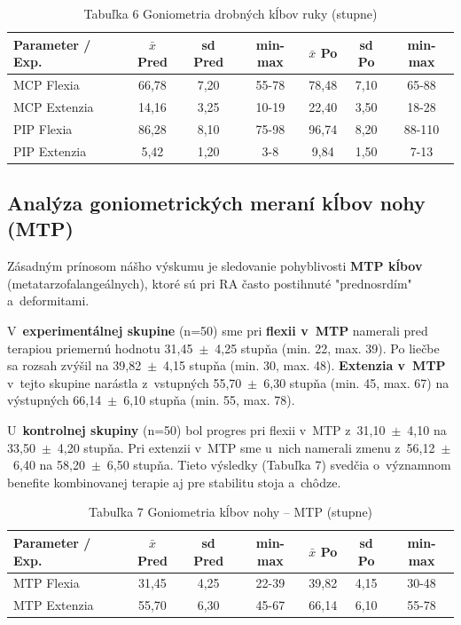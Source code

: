 \begin{table}[H]
\centering
\caption*{Tabuľka 6 Goniometria drobných kĺbov ruky (stupne)}
\begin{tabular}{|l|c|c|c|c|c|c|}
\hline
\textbf{Parameter / Exp.} & \textbf{$\bar{x}$ Pred} & \textbf{sd Pred} & \textbf{min-max} & \textbf{$\bar{x}$ Po} & \textbf{sd Po} & \textbf{min-max} \\ \hline
MCP Flexia & 66,78 & 7,20 & 55-78 & 78,48 & 7,10 & 65-88 \\ \hline
MCP Extenzia & 14,16 & 3,25 & 10-19 & 22,40 & 3,50 & 18-28 \\ \hline
PIP Flexia & 86,28 & 8,10 & 75-98 & 96,74 & 8,20 & 88-110 \\ \hline
PIP Extenzia & 5,42 & 1,20 & 3-8 & 9,84 & 1,50 & 7-13 \\ \hline
\end{tabular}
\end{table}

\subsection{Analýza goniometrických meraní kĺbov nohy (MTP)}

Zásadným prínosom nášho výskumu je sledovanie pohyblivosti \textbf{MTP kĺbov} (metatarzofalangeálnych), ktoré sú pri RA často postihnuté "prednosrdím" a~deformitami.

V~\textbf{experimentálnej skupine} (n=50) sme pri \textbf{flexii v~MTP} namerali pred terapiou priemernú hodnotu 31,45~$\pm$~4,25 stupňa (min. 22, max. 39). Po liečbe sa rozsah zvýšil na 39,82~$\pm$~4,15 stupňa (min. 30, max. 48). \textbf{Extenzia v~MTP} v~tejto skupine narástla z~vstupných 55,70~$\pm$~6,30 stupňa (min. 45, max. 67) na výstupných 66,14~$\pm$~6,10 stupňa (min. 55, max. 78).

U~\textbf{kontrolnej skupiny} (n=50) bol progres pri flexii v~MTP z~31,10~$\pm$~4,10 na 33,50~$\pm$~4,20 stupňa. Pri extenzii v~MTP sme u~nich namerali zmenu z~56,12~$\pm$~6,40 na 58,20~$\pm$~6,50 stupňa. Tieto výsledky (Tabuľka 7) svedčia o~významnom benefite kombinovanej terapie aj pre stabilitu stoja a~chôdze.

\begin{table}[H]
\centering
\caption*{Tabuľka 7 Goniometria kĺbov nohy – MTP (stupne)}
\begin{tabular}{|l|c|c|c|c|c|c|}
\hline
\textbf{Parameter / Exp.} & \textbf{$\bar{x}$ Pred} & \textbf{sd Pred} & \textbf{min-max} & \textbf{$\bar{x}$ Po} & \textbf{sd Po} & \textbf{min-max} \\ \hline
MTP Flexia & 31,45 & 4,25 & 22-39 & 39,82 & 4,15 & 30-48 \\ \hline
MTP Extenzia & 55,70 & 6,30 & 45-67 & 66,14 & 6,10 & 55-78 \\ \hline
\end{tabular}
\end{table}

